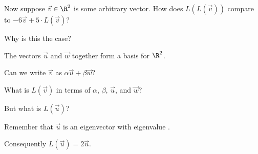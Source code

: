 \documentclass{ximera}
\begin{document}
\begin{question}
  Now suppose $\vec{v} \in \R^2$ is some arbitrary vector.  How does
  $L(L(\vec{v}))$ compare to $-6 \vec{v} + 5 \cdot L(\vec{v})$?  

  \begin{solution}
    \begin{multiple-choice}
    \end{multiple-choice}
  \end{solution}

  Why is this the case?
  
  \begin{solution}
    \begin{hint}
      The vectors $\vec{u}$ and $\vec{w}$ together form a basis for $\R^2$.
    \end{hint}

    Can we write $\vec{v}$ as $\alpha \vec{u} + \beta \vec{w}$?

    \begin{multiple-choice}
    \end{multiple-choice}    
  \end{solution}
  
  What is $L(\vec{v})$ in terms of $\alpha$, $\beta$, $\vec{u}$, and $\vec{w}$?
  \begin{solution}
    \begin{multiple-choice}
    \end{multiple-choice} 
  \end{solution}
  
  But what is $L(\vec{u})$?
  \begin{solution}
    \begin{hint}
      \begin{question}
        \begin{solution}
          Remember that $\vec{u}$ is an eigenvector with eigenvalue .
        \end{solution}

        Consequently $L(\vec{u}) = 2 \vec{u}$.
      \end{question}
    \end{hint}
    

\end{solution}
\end{question}
\end{document}
